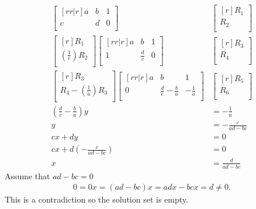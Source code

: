 \documentclass[12pt]{article}
\begin{document}
\begin{enumerate}
\begin{align*}
\begin{bmatrix}[rr|r]
a & b & 1\\
c & d & 0\\
\end{bmatrix}&
\begin{bmatrix}[r]
R_1\\ R_2\\
\end{bmatrix}\\
%
\begin{bmatrix}[r]
R_1\\
(\frac{1}{c})R_2\\
\end{bmatrix}
\begin{bmatrix}[rr|r]
a & b & 1\\
1 & \frac{d}{c} & 0\\
\end{bmatrix}&
\begin{bmatrix}[r]
R_3\\ R_4\\
\end{bmatrix}\\
%
\begin{bmatrix}[r]
R_3\\
R_4 - (\frac{1}{a})R_3\\
\end{bmatrix}
\begin{bmatrix}[rr|r]
a & b & 1\\
0 & \frac{d}{c} - \frac{b}{a} & -\frac{1}{a}\\
\end{bmatrix}&
\begin{bmatrix}[r]
R_5\\ R_6\\
\end{bmatrix}\\
%
(\frac{d}{c} - \frac{b}{a})y &= -\frac{1}{a}\\
y &= -\frac{c}{ad-bc}\\
cx+dy &= 0\\
cx+d(-\frac{c}{ad-bc}) &= 0\\
x &= \frac{d}{ad-bc}
\end{align*}
Assume that $ad-bc = 0$
\begin{align*}
0 = 0x = (ad-bc)x = adx-bcx = d \neq 0.
\end{align*}
This is a contradiction so the solution set is empty.
\end{enumerate}
\end{document}
